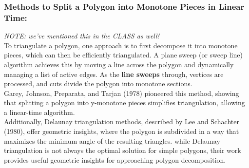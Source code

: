 \documentclass{article}
\begin{document}
\subsubsection*{Methods to Split a Polygon into Monotone Pieces in Linear Time: }
\textit{NOTE: we've mentioned this in the CLASS as well!}
\\
To triangulate a polygon, one approach is to first decompose it into monotone pieces, which can then be efficiently triangulated. A plane sweep (or sweep line) algorithm achieves this by moving a line across the polygon and dynamically managing a list of active edges. As the \textbf{line sweeps} through, vertices are processed, and cuts divide the polygon into monotone sections.
\\
Garey, Johnson, Preparata, and Tarjan (1978) pioneered this method, showing that splitting a polygon into y-monotone pieces simplifies triangulation, allowing a linear-time algorithm. 
\\
Additionally, Delaunay triangulation methods, described by Lee and Schachter (1980), offer geometric insights, where the polygon is subdivided in a way that maximizes the minimum angle of the resulting triangles. while Delaunay triangulation is not always the optimal solution for simple polygons, their work provides useful geometric insights for approaching polygon decomposition.
\end{document}
